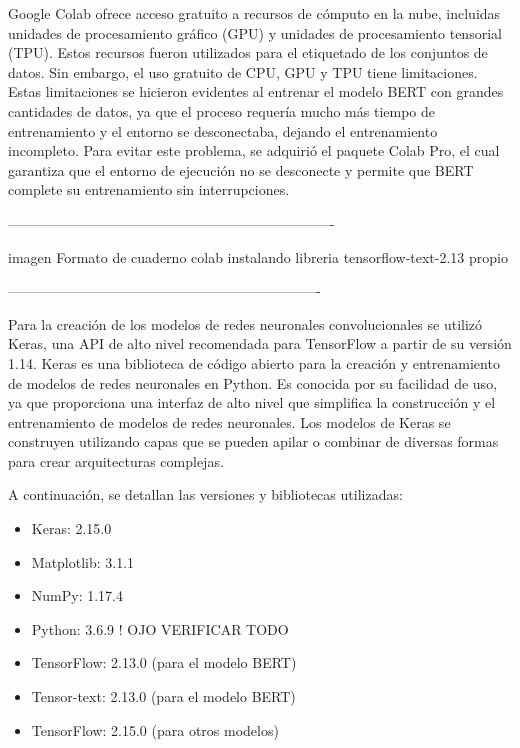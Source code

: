 Google Colab ofrece acceso gratuito a recursos de cómputo en la nube, incluidas unidades de procesamiento gráfico (GPU) y unidades de procesamiento tensorial (TPU). Estos recursos fueron utilizados para el etiquetado de los conjuntos de datos. Sin embargo, el uso gratuito de CPU, GPU y TPU tiene limitaciones. Estas limitaciones se hicieron evidentes al entrenar el modelo BERT con grandes cantidades de datos, ya que el proceso requería mucho más tiempo de entrenamiento y el entorno se desconectaba, dejando el entrenamiento incompleto. Para evitar este problema, se adquirió el paquete Colab Pro, el cual garantiza que el entorno de ejecución no se desconecte y permite que BERT complete su entrenamiento sin interrupciones.

----------------------------------------------------------------------

imagen Formato de cuaderno colab instalando 
libreria tensorflow-text-2.13 propio

-------------------------------------------------------------------

Para la creación de los modelos de redes neuronales convolucionales se utilizó Keras, una API de alto nivel recomendada para TensorFlow a partir de su versión 1.14. Keras es una biblioteca de código abierto para la creación y entrenamiento de modelos de redes neuronales en Python. Es conocida por su facilidad de uso, ya que proporciona una interfaz de alto nivel que simplifica la construcción y el entrenamiento de modelos de redes neuronales. Los modelos de Keras se construyen utilizando capas que se pueden apilar o combinar de diversas formas para crear arquitecturas complejas.

A continuación, se detallan las versiones y bibliotecas utilizadas:

\begin{itemize}

\item Keras: 2.15.0
\item Matplotlib: 3.1.1
\item NumPy: 1.17.4
\item Python: 3.6.9 ! OJO VERIFICAR TODO
\item TensorFlow: 2.13.0 (para el modelo BERT)
\item Tensor-text: 2.13.0 (para el modelo BERT)
\item TensorFlow: 2.15.0 (para otros modelos)

\end{itemize}